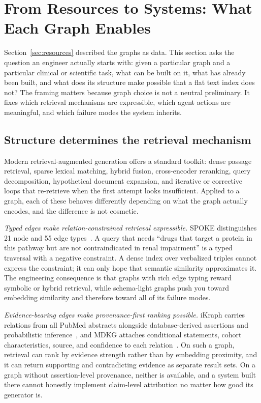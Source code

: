 \section{From Resources to Systems: What Each Graph Enables}
\label{sec:enables}

Section~\ref{sec:resources} described the graphs as data. This section asks the question an engineer actually starts with: given a particular graph and a particular clinical or scientific task, what can be built on it, what has already been built, and what does its structure make possible that a flat text index does not? The framing matters because graph choice is not a neutral preliminary. It fixes which retrieval mechanisms are expressible, which agent actions are meaningful, and which failure modes the system inherits.

\subsection{Structure determines the retrieval mechanism}

Modern retrieval-augmented generation offers a standard toolkit: dense passage retrieval, sparse lexical matching, hybrid fusion, cross-encoder reranking, query decomposition, hypothetical document expansion, and iterative or corrective loops that re-retrieve when the first attempt looks insufficient. Applied to a graph, each of these behaves differently depending on what the graph actually encodes, and the difference is not cosmetic.

\emph{Typed edges make relation-constrained retrieval expressible.} SPOKE distinguishes 21 node and 55 edge types~\cite{morris2023spoke}. A query that needs ``drugs that target a protein in this pathway but are not contraindicated in renal impairment'' is a typed traversal with a negative constraint. A dense index over verbalized triples cannot express the constraint; it can only hope that semantic similarity approximates it. The engineering consequence is that graphs with rich edge typing reward symbolic or hybrid retrieval, while schema-light graphs push you toward embedding similarity and therefore toward all of its failure modes.

\emph{Evidence-bearing edges make provenance-first ranking possible.} iKraph carries relations from all PubMed abstracts alongside database-derived assertions and probabilistic inference~\cite{zhang2025ikraph}, and MDKG attaches conditional statements, cohort characteristics, source, and confidence to each relation~\cite{gao2025mdkg}. On such a graph, retrieval can rank by evidence strength rather than by embedding proximity, and it can return supporting and contradicting evidence as separate result sets. On a graph without assertion-level provenance, neither is available, and a system built there cannot honestly implement claim-level attribution no matter how good its generator is.

